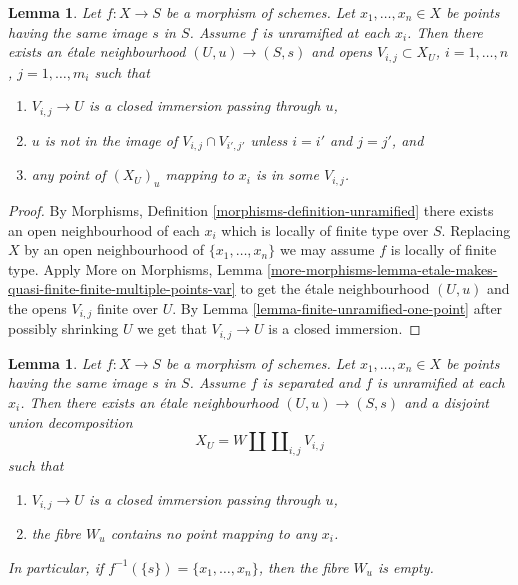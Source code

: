 \documentclass{stacks-project}
\theoremstyle{plain}
\newtheorem{lemma}[subsection]{Lemma}
\theoremstyle{definition}
\theoremstyle{remark}
\numberwithin{equation}{subsection}
\begin{document}
\begin{lemma}
\label{lemma-unramified-etale-local}
Let $f : X \to S$ be a morphism of schemes.
Let $x_1, \ldots, x_n \in X$ be points having the same image $s$ in $S$.
Assume $f$ is unramified at each $x_i$.
Then there exists an \'etale neighbourhood $(U, u) \to (S, s)$
and opens $V_{i, j} \subset X_U$, $i = 1, \ldots, n$, $j = 1, \ldots, m_i$
such that
\begin{enumerate}
\item $V_{i, j} \to U$ is a closed immersion passing through $u$,
\item $u$ is not in the image of $V_{i, j} \cap V_{i', j'}$ unless
$i = i'$ and $j = j'$, and
\item any point of $(X_U)_u$ mapping to $x_i$ is in some $V_{i, j}$.
\end{enumerate}
\end{lemma}

\begin{proof}
By
Morphisms, Definition \ref{morphisms-definition-unramified}
there exists an open neighbourhood of each $x_i$ which is locally of finite
type over $S$. Replacing $X$ by an open neighbourhood of $\{x_1, \ldots, x_n\}$
we may assume $f$ is locally of finite type. Apply
More on Morphisms, Lemma
\ref{more-morphisms-lemma-etale-makes-quasi-finite-finite-multiple-points-var}
to get the \'etale neighbourhood $(U, u)$ and the opens $V_{i, j}$ finite over
$U$. By
Lemma \ref{lemma-finite-unramified-one-point}
after possibly shrinking $U$ we get that $V_{i, j} \to U$ is a closed
immersion.
\end{proof}

\begin{lemma}
\label{lemma-unramified-etale-local-technical}
Let $f : X \to S$ be a morphism of schemes.
Let $x_1, \ldots, x_n \in X$ be points having the same image $s$ in $S$.
Assume $f$ is separated and $f$ is unramified at each $x_i$.
Then there exists an \'etale neighbourhood $(U, u) \to (S, s)$
and a disjoint union decomposition
$$
X_U =
W \amalg \coprod\nolimits_{i, j} V_{i, j}
$$
such that
\begin{enumerate}
\item $V_{i, j} \to U$ is a closed immersion passing through $u$,
\item the fibre $W_u$ contains no point mapping to any $x_i$.
\end{enumerate}
In particular, if $f^{-1}(\{s\}) = \{x_1, \ldots, x_n\}$, then
the fibre $W_u$ is empty.
\end{lemma}
\end{document}
